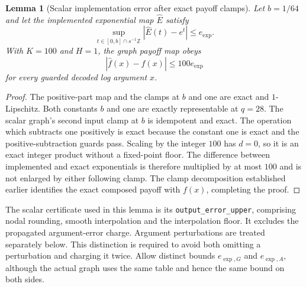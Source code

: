 \documentclass[11pt]{article}
\newtheorem{lemma}[theorem]{Lemma}
\begin{document}
\begin{lemma}[Scalar implementation error after exact payoff clamps]
\label{lem:raw-payoff-scalar-error}
Let $b=1/64$ and let the implemented exponential map $\widehat E$ satisfy
\begin{equation}
 \sup_{t\in[0,b]\cap s^{-1}\mathbb Z}
 |\widehat E(t)-e^t|\leq e_{\exp}.
\end{equation}
With $K=100$ and $H=1$, the graph payoff map obeys
\begin{equation}
 |\widehat f(x)-f(x)|\leq100e_{\exp}
\end{equation}
for every guarded decoded log argument $x$.
\end{lemma}
\begin{proof}
The positive-part map and the clamps at $b$ and one are exact and
$1$-Lipschitz. Both constants $b$ and one are exactly representable at
$q=28$. The scalar graph's second input clamp at $b$ is idempotent and
exact. The operation which subtracts one positively is exact because
the constant one is exact and the positive-subtraction guards pass.
Scaling by the integer $100$ has $d=0$, so it is an exact integer product
without a fixed-point floor. The difference between implemented and exact
exponentials is therefore multiplied by at most $100$ and is not enlarged
by either following clamp. The clamp decomposition established earlier
identifies the exact composed payoff with $f(x)$, completing the proof.
\end{proof}

The scalar certificate used in this lemma is its
\texttt{output\_error\_upper}, comprising nodal rounding, smooth
interpolation and the interpolation floor. It excludes the propagated
argument-error charge. Argument perturbations are treated separately
below. This distinction is required to avoid both omitting a perturbation
and charging it twice. Allow distinct bounds $e_{\exp,G}$ and
$e_{\exp,A}$, although the actual graph uses the same table and hence the
same bound on both sides.
\end{document}
